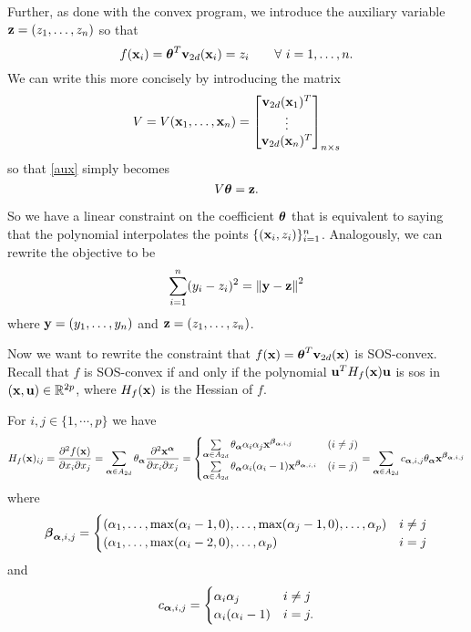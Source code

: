 \documentclass[11pt]{article}
\begin{document}
Further, as done with the convex program, we introduce the auxiliary variable ${\bf z} = (z_1, \dotsc, z_n)$ so that 
\begin{equation}\label{aux}
f({\bf x}_i) = {\boldsymbol\theta}^T{\bf v}_{2d}({\bf x}_i) = z_i \qquad\forall\ i = 1, \dotsc, n.
\end{equation}
We can write this more concisely by introducing the matrix
\[
V = V({\bf x}_1, \dotsc, {\bf x}_n) = \begin{bmatrix}
{\bf v}_{2d}({\bf x}_1)^T \\
\vdots \\
{\bf v}_{2d}({\bf x}_n)^T
\end{bmatrix}_{n \times s}
\]
so that \eqref{aux} simply becomes
\begin{equation}\label{sos-poly}
V{\boldsymbol\theta} = {\bf z}.
\end{equation}

So we have a linear constraint on the coefficient ${\boldsymbol\theta}$ that is equivalent to saying that the polynomial interpolates the points $\{({\bf x}_i, z_i)\}_{i=1}^n$. Analogously, we can rewrite the objective to be
\begin{equation}\label{sos-reg-obj2}
\sum_{i=1}^n(y_i - z_i)^2 = \left\lVert {\bf y} - {\bf z} \right\rVert^2
\end{equation}
where ${\bf y} = (y_1, \dotsc, y_n)$ and ${\bf z} = (z_1, \dotsc, z_n)$.


Now we want to rewrite the constraint that $f({\bf x}) = {\boldsymbol\theta}^T{\bf v}_{2d}({\bf x})$ is SOS-convex. Recall that $f$ is SOS-convex if and only if the polynomial ${\bf u}^T H_f({\bf x}){\bf u}$ is sos in $({\bf x}, {\bf u}) \in \mathbb R^{2p}$, where $H_f({\bf x})$ is the Hessian of $f$.

For $i, j\in\{1, \cdots, p\}$ we have
\begin{equation} \label{hessian}
H_f({\bf x})_{ij} = \frac{\partial^2 f({\bf x})}{\partial x_i \partial x_j}  = \sum_{{\boldsymbol\alpha} \in A_{2d} } \theta_{\boldsymbol\alpha} \frac{\partial^2 {\bf x}^{\boldsymbol\alpha}}{\partial x_i \partial x_j} = 
\begin{cases}
\sum\limits_{{\boldsymbol\alpha} \in A_{2d} } \theta_{\boldsymbol\alpha} \alpha_i \alpha_j {\bf x}^{{\boldsymbol\beta}_{{\boldsymbol\alpha}, i,j}} & (i \not= j)\\
\sum\limits_{{\boldsymbol\alpha} \in A_{2d}} \theta_{\boldsymbol\alpha} \alpha_i (\alpha_i-1) {\bf x}^{{\boldsymbol\beta}_{{\boldsymbol\alpha}, i,i}} & (i = j)
\end{cases}
= \sum_{{\boldsymbol\alpha} \in A_{2d} } c_{{\boldsymbol\alpha}, i, j} \theta_{\boldsymbol\alpha}  {\bf x}^{{\boldsymbol\beta}_{{\boldsymbol\alpha}, i,j}}
\end{equation}
where
\begin{equation}\notag
{\boldsymbol\beta}_{{\boldsymbol\alpha}, i,j} =
\begin{cases}
 (\alpha_1, \dotsc, \max(\alpha_i-1, 0), \dotsc, \max(\alpha_j-1, 0), \dotsc, \alpha_p) & i \neq j\\
(\alpha_1, \dotsc, \max(\alpha_i-2, 0), \dotsc, \alpha_p) & i = j
\end{cases}
\end{equation}
and
\begin{equation}\notag
c_{{\boldsymbol\alpha}, i, j} =
\begin{cases}
\alpha_i \alpha_j  & i \not= j\\
\alpha_i (\alpha_i - 1)  & i = j.
\end{cases}
\end{equation}
\end{document}
